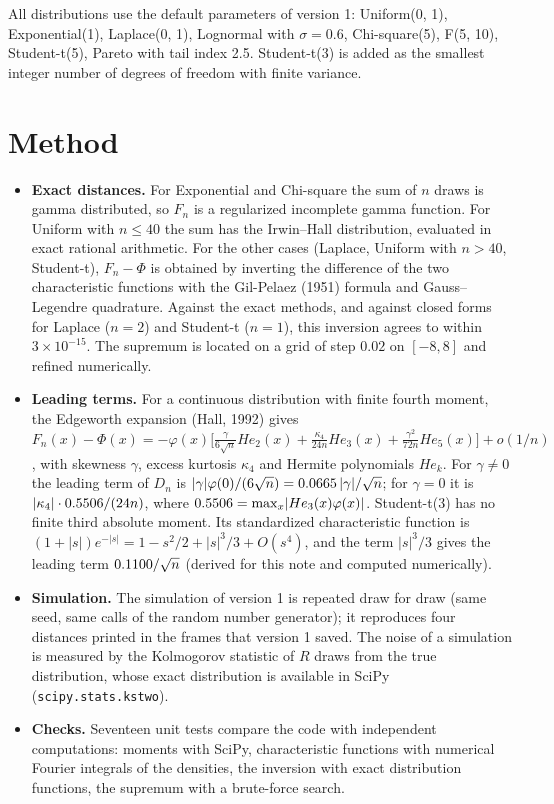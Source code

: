 \documentclass[11pt,a4paper]{article}
\begin{document}
All distributions use the default parameters of version 1: Uniform(0, 1), Exponential(1), Laplace(0, 1), Lognormal with
$\sigma = 0.6$, Chi-square(5), F(5, 10), Student-t(5), Pareto with tail index 2.5. Student-t(3) is added as the smallest integer
number of degrees of freedom with finite variance.

\section{Method}

\begin{itemize}
  \item \textbf{Exact distances.} For Exponential and Chi-square the sum of $n$ draws is gamma distributed, so $F_n$ is a
  regularized incomplete gamma function. For Uniform with $n \le 40$ the sum has the Irwin--Hall distribution, evaluated in exact
  rational arithmetic. For the other cases (Laplace, Uniform with $n > 40$, Student-t), $F_n - \Phi$ is obtained by inverting the
  difference of the two characteristic functions with the Gil-Pelaez (1951) formula and Gauss--Legendre quadrature. Against the
  exact methods, and against closed forms for Laplace ($n = 2$) and Student-t ($n = 1$), this inversion agrees to within
  $3\times 10^{-15}$. The supremum is located on a grid of step $0.02$ on $[-8, 8]$ and refined numerically.
  \item \textbf{Leading terms.} For a continuous distribution with finite fourth moment, the Edgeworth expansion (Hall, 1992) gives
  $F_n(x) - \Phi(x) = -\varphi(x)\bigl[\tfrac{\gamma}{6\sqrt n}He_2(x) + \tfrac{\kappa_4}{24n}He_3(x) + \tfrac{\gamma^2}{72n}He_5(x)\bigr]
  + o(1/n)$, with skewness $\gamma$, excess kurtosis $\kappa_4$ and Hermite polynomials $He_k$. For $\gamma \ne 0$ the leading term
  of $D_n$ is $\lvert\gamma\rvert\varphi(0)/(6\sqrt n) = 0.0665\,\lvert\gamma\rvert/\sqrt n$; for $\gamma = 0$ it is
  $\lvert\kappa_4\rvert \cdot 0.5506/(24n)$, where $0.5506 = \max_x\lvert He_3(x)\varphi(x)\rvert$. Student-t(3) has no finite
  third absolute moment. Its standardized characteristic function is $(1+\lvert s\rvert)e^{-\lvert s\rvert} = 1 - s^2/2 +
  \lvert s\rvert^3/3 + O(s^4)$, and the term $\lvert s\rvert^3/3$ gives the leading term $0.1100/\sqrt n$ (derived for this
  note and computed numerically).
  \item \textbf{Simulation.} The simulation of version 1 is repeated draw for draw (same seed, same calls of the random number
  generator); it reproduces four distances printed in the frames that version 1 saved. The noise of a simulation is measured
  by the Kolmogorov statistic of $R$ draws from the true distribution, whose exact distribution is available in SciPy
  (\texttt{scipy.stats.kstwo}).
  \item \textbf{Checks.} Seventeen unit tests compare the code with independent computations: moments with SciPy, characteristic
  functions with numerical Fourier integrals of the densities, the inversion with exact distribution functions, the supremum
  with a brute-force search.
\end{itemize}
\end{document}
